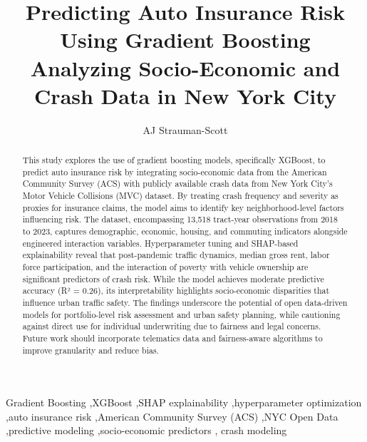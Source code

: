 \documentclass[
  number,
  review,
  3p]{elsarticle}
\begin{document}
\begin{frontmatter}
\title{Predicting Auto Insurance Risk Using Gradient
Boosting \\\large{Analyzing Socio-Economic and Crash Data in New York
City} }
\author[1]{AJ Strauman-Scott%
%
}



        
\begin{abstract}
This study explores the use of gradient boosting models, specifically
XGBoost, to predict auto insurance risk by integrating socio-economic
data from the American Community Survey (ACS) with publicly available
crash data from New York City's Motor Vehicle Collisions (MVC) dataset.
By treating crash frequency and severity as proxies for insurance
claims, the model aims to identify key neighborhood-level factors
influencing risk. The dataset, encompassing 13,518 tract-year
observations from 2018 to 2023, captures demographic, economic, housing,
and commuting indicators alongside engineered interaction variables.
Hyperparameter tuning and SHAP-based explainability reveal that
post-pandemic traffic dynamics, median gross rent, labor force
participation, and the interaction of poverty with vehicle ownership are
significant predictors of crash risk. While the model achieves moderate
predictive accuracy (R² = 0.26), its interpretability highlights
socio-economic disparities that influence urban traffic safety. The
findings underscore the potential of open data-driven models for
portfolio-level risk assessment and urban safety planning, while
cautioning against direct use for individual underwriting due to
fairness and legal concerns. Future work should incorporate telematics
data and fairness-aware algorithms to improve granularity and reduce
bias.
\end{abstract}





\begin{keyword}
    Gradient Boosting \sep XGBoost \sep SHAP
explainability \sep hyperparameter optimization \sep auto insurance
risk \sep American Community Survey (ACS) \sep NYC Open
Data \sep predictive modeling \sep socio-economic predictors \sep 
    crash modeling
\end{keyword}
\end{frontmatter}
    
\end{document}
